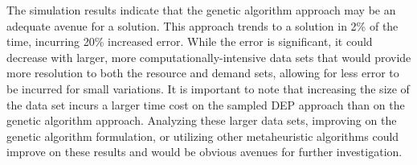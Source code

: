 \documentclass[onecolumn,draftcls]{IEEEtran}
\begin{document}
The simulation results indicate that the genetic algorithm approach may be an adequate avenue for a solution.  This approach trends to a solution in 2\% of the time, incurring 20\% increased error.  While the error is significant, it could decrease with larger, more computationally-intensive data sets that would provide more resolution to both the resource and demand sets, allowing for less error to be incurred for small variations.  It is important to note that increasing the size of the data set incurs a larger time cost on the sampled DEP approach than on the genetic algorithm approach.  Analyzing these larger data sets, improving on the genetic algorithm formulation, or utilizing other metaheuristic algorithms could improve on these results and would be obvious avenues for further investigation.














%
%
%





\end{document}
